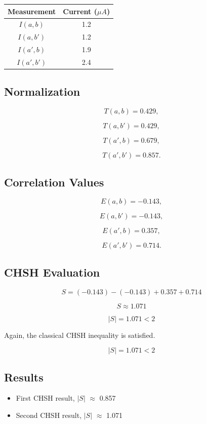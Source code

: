 \documentclass[17pt,a4paper]{extarticle}
\begin{document}
\begin{table}[h]
\centering
\begin{tabular}{c c}
Measurement & Current ($\mu A$) \\
\hline
$I(a,b)$ & 1.2 \\
$I(a,b')$ & 1.2 \\
$I(a',b)$ & 1.9 \\
$I(a',b')$ & 2.4 \\
\end{tabular}
\end{table}

\subsection{Normalization}

\[
T(a,b) = 0.429,
\]

\[
T(a,b') = 0.429,
\]

\[
T(a',b) = 0.679,
\]

\[
T(a',b') = 0.857.
\]

\subsection{Correlation Values}

\[
E(a,b) = -0.143,
\]

\[
E(a,b') = -0.143,
\]

\[
E(a',b) = 0.357,
\]

\[
E(a',b') = 0.714.
\]

\subsection{CHSH Evaluation}

\[
S = (-0.143) - (-0.143) + 0.357 + 0.714
\]

\[
S \approx 1.071
\]

\[
|S| = 1.071 < 2
\]

Again, the classical CHSH inequality is satisfied.

\[
|S| = 1.071 < 2
\]

\subsection{Results}
\begin{itemize}
    \item First CHSH result, $|S|$ $\approx$ 0.857
    \item Second CHSH result, $|S|$ $\approx$ 1.071
\end{itemize}
\end{document}
